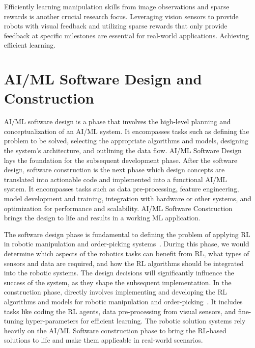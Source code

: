 \documentclass[11pt]{article}
\begin{document}
Efficiently learning manipulation skills from image observations and sparse rewards is another crucial research focus. Leveraging vision sensors to provide robots with visual feedback and utilizing sparse rewards that only provide feedback at specific milestones are essential for real-world applications. Achieving efficient learning.


\section*{AI/ML Software Design and Construction}



AI/ML software design is a phase that involves the high-level planning and conceptualization of an AI/ML system. It encompasses tasks such as defining the problem to be solved, selecting the appropriate algorithms and models, designing the system's architecture, and outlining the data flow. AI/ML Software Design lays the foundation for the subsequent development phase. After the software design, software construction is the next phase which design concepts are translated into actionable code and implemented into a functional AI/ML system. It encompasses tasks such as data pre-processing, feature engineering, model development and training, integration with hardware or other systems, and optimization for performance and scalability. AI/ML Software Construction brings the design to life and results in a working ML application.

The software design phase is fundamental to defining the problem of applying RL in robotic manipulation and order-picking systems~\cite{garcia2020robotics}. During this phase, we would determine which aspects of the robotics tasks can benefit from RL, what types of sensors and data are required, and how the RL algorithms should be integrated into the robotic systems. The design decisions will significantly influence the success of the system, as they shape the subsequent implementation. In the construction phase, directly involves implementing and developing the RL algorithms and models for robotic manipulation and order-picking~\cite{macenski2022robot}. It includes tasks like coding the RL agents, data pre-processing from visual sensors, and fine-tuning hyper-parameters for efficient learning. The robotic solution systems rely heavily on the AI/ML Software construction phase to bring the RL-based solutions to life and make them applicable in real-world scenarios.
\end{document}
